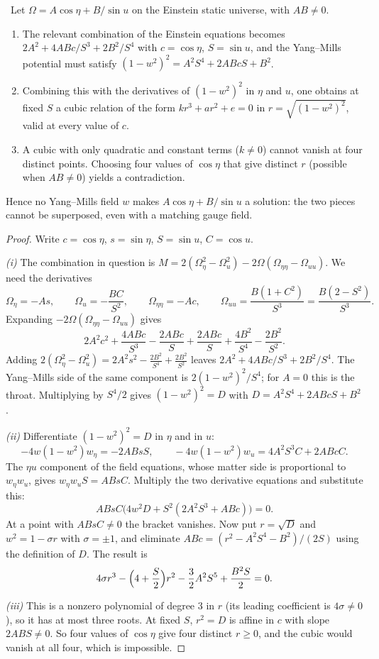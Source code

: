 \begin{theorem}[No superposition]\label{thm:nosuperpos}\ver\nogo\
Let $\Omega=A\cos\eta+B/\sin u$ on the Einstein static universe, with $AB\ne0$.
\begin{enumerate}[label=(\roman*)]
\item The relevant combination of the Einstein equations becomes $2A^2+4ABc/S^3+2B^2/S^4$ with $c=\cos\eta$, $S=\sin u$, and the Yang--Mills potential must satisfy $(1-w^2)^2=A^2S^4+2ABcS+B^2$.
\item Combining this with the derivatives of $(1-w^2)^2$ in $\eta$ and $u$, one obtains at fixed $S$ a cubic relation of the form $kr^3+ar^2+e=0$ in $r=\sqrt{(1-w^2)^2}$, valid at every value of $c$.
\item A cubic with only quadratic and constant terms ($k\ne0$) cannot vanish at four distinct points. Choosing four values of $\cos\eta$ that give distinct $r$ (possible when $AB\ne0$) yields a contradiction.
\end{enumerate}
Hence no Yang--Mills field $w$ makes $A\cos\eta+B/\sin u$ a solution: the two pieces cannot be superposed, even with a matching gauge field.
\end{theorem}
\begin{proof}
Write $c=\cos\eta$, $s=\sin\eta$, $S=\sin u$, $C=\cos u$.

\emph{(i)} The combination in question is $M=2(\Omega_\eta^2-\Omega_u^2)-2\Omega(\Omega_{\eta\eta}-\Omega_{uu})$. We need the derivatives
\[
\Omega_\eta=-As,\qquad\Omega_u=-\frac{BC}{S^2},\qquad\Omega_{\eta\eta}=-Ac,\qquad\Omega_{uu}=\frac{B(1+C^2)}{S^3}=\frac{B(2-S^2)}{S^3}.
\]
Expanding $-2\Omega(\Omega_{\eta\eta}-\Omega_{uu})$ gives
\[
2A^2c^2+\frac{4ABc}{S^3}-\frac{2ABc}S+\frac{2ABc}S+\frac{4B^2}{S^4}-\frac{2B^2}{S^2}.
\]
Adding $2(\Omega_\eta^2-\Omega_u^2)=2A^2s^2-\frac{2B^2}{S^4}+\frac{2B^2}{S^2}$ leaves $2A^2+4ABc/S^3+2B^2/S^4$. The Yang--Mills side of the same component is $2(1-w^2)^2/S^4$; for $A=0$ this is the throat. Multiplying by $S^4/2$ gives $(1-w^2)^2=D$ with $D=A^2S^4+2ABcS+B^2$.

\emph{(ii)} Differentiate $(1-w^2)^2=D$ in $\eta$ and in $u$:
\[
-4w(1-w^2)w_\eta=-2ABsS,\qquad-4w(1-w^2)w_u=4A^2S^3C+2ABcC .
\]
The $\eta u$ component of the field equations, whose matter side is proportional to $w_\eta w_u$, gives $w_\eta w_uS=ABsC$. Multiply the two derivative equations and substitute this:
\[
ABsC\bigl(4w^2D+S^2(2A^2S^3+ABc)\bigr)=0 .
\]
At a point with $ABsC\ne0$ the bracket vanishes. Now put $r=\sqrt D$ and $w^2=1-\sigma r$ with $\sigma=\pm1$, and eliminate $ABc=(r^2-A^2S^4-B^2)/(2S)$ using the definition of $D$. The result is
\[
4\sigma r^3-\Bigl(4+\frac S2\Bigr)r^2-\frac32A^2S^5+\frac{B^2S}2=0 .
\]

\emph{(iii)} This is a nonzero polynomial of degree $3$ in $r$ (its leading coefficient is $4\sigma\ne0$), so it has at most three roots. At fixed $S$, $r^2=D$ is affine in $c$ with slope $2ABS\ne0$. So four values of $\cos\eta$ give four distinct $r\ge0$, and the cubic would vanish at all four, which is impossible.
\end{proof}


